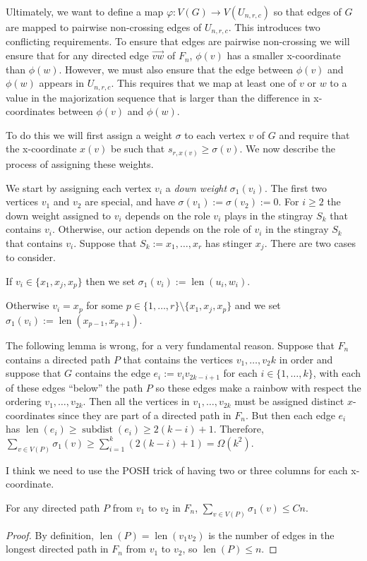 \documentclass{patmorin}
\newenvironment{epat}{\color{Maroon}}{}
\newcommand{\defin}[1]{\emph{\color{brightmaroon}#1}}
\DeclareMathOperator{\sd}{subdist}
\DeclareMathOperator{\len}{len}
\begin{document}
Ultimately, we want to define a map $\varphi:V(G)\to V(U_{n,r,c})$ so that edges of $G$ are mapped to pairwise non-crossing edges of $U_{n,r,c}$.  This introduces two conflicting requirements. To ensure that edges are pairwise non-crossing we will ensure that for any directed edge $\overrightarrow{vw}$ of $F_n$, $\phi(v)$ has a smaller x-coordinate than $\phi(w)$.   However, we must also ensure that the edge between $\phi(v)$ and $\phi(w)$ appears in $U_{n,r,c}$. This requires that we map at least one of $v$ or $w$ to a value in the majorization sequence that is larger than the difference in x-coordinates between $\phi(v)$ and $\phi(w)$.

To do this we will first assign a weight $\sigma$ to each vertex $v$ of $G$ and require that the x-coordinate $x(v)$ be such that $s_{r,x(v)} \ge \sigma(v)$.  We now describe the process of assigning these weights.

We start by assigning each vertex $v_i$ a \defin{down weight} $\sigma_1(v_i)$. The first two vertices $v_1$ and $v_2$ are special, and have $\sigma(v_1):=\sigma(v_2):=0$.  For $i\ge 2$ the down weight assigned to $v_i$ depends on the role $v_i$ plays in the stingray $S_k$ that contains $v_i$.  Otherwise, our action depends on the role of $v_i$ in the stingray $S_k$ that contains $v_i$.  Suppose that $S_k:=x_1,\ldots,x_r$ has stinger $x_j$.  There are two cases to consider.
\begin{compactenum}
  \item If $v_i\in\{x_1,x_j,x_p\}$ then we set $\sigma_1(v_i):=\len(u_i,w_i)$.

  \item Otherwise $v_i=x_p$ for some $p\in\{1,\ldots,r\}\setminus\{x_1,x_j,x_p\}$ and we set $\sigma_1(v_i):=\len(x_{p-1},x_{p+1})$.
\end{compactenum}

\begin{epat}
  The following lemma is wrong, for a very fundamental reason.  Suppose that $F_n$ contains a directed path $P$ that contains the vertices $v_1,\ldots,v_2k$ in order and suppose that $G$ contains the edge $e_i:=v_iv_{2k-i+1}$ for each $i\in\{1,\ldots,k\}$, with each of these edges ``below'' the path $P$ so these edges make a rainbow with respect the ordering $v_1,\ldots,v_{2k}$.  Then all the vertices in $v_1,\ldots,v_{2k}$ must be assigned distinct $x$-coordinates since they are part of a directed path in $F_n$. But then each edge $e_i$ has $\len(e_i)\ge \sd(e_i)\ge 2(k-i)+1$. Therefore, $\sum_{v\in V(P)}\sigma_1(v)\ge \sum_{i=1}^k (2(k-i)+1) = \Omega(k^2)$.

  I think we need to use the POSH trick of having two or three columns for each x-coordinate.
\end{epat}

\begin{lem}
  For any directed path $P$ from $v_1$ to $v_2$ in $F_n$, $\sum_{v\in V(P)} \sigma_1(v) \le Cn$.
\end{lem}

\begin{proof}
  By definition, $\len(P)=\len(v_1v_2)$ is the number of edges in the longest directed path in $F_n$ from $v_1$ to $v_2$, so $\len(P)\le n$.
\end{proof}
\end{document}

